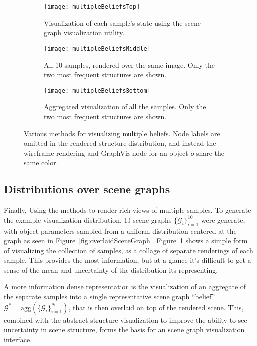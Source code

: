\raggedbottom
\pagebreak
\flushbottom

\begin{figure}[H]
  \begin{subfigure}[b]{\textwidth}
    \centering
    \texttt{[image: multipleBeliefsTop]}
    \caption{
      Visualization of each sample's state using the scene graph visualization utility.
    }
    \label{fig:multipleBeliefsTop}
  \end{subfigure}
  \begin{subfigure}[b]{\textwidth}
    \centering
    \texttt{[image: multipleBeliefsMiddle]}
    \caption{
      All 10 samples, rendered over the same image. Only the two most frequent structures are shown.
    }
    \label{fig:multipleBeliefsMiddle}
  \end{subfigure}
  \begin{subfigure}[b]{\textwidth}
    \centering
    \texttt{[image: multipleBeliefsBottom]}
    \caption{
      Aggregated visualization of all the samples. Only the two most frequent structures are shown.
    }
    \label{fig:multipleBeliefsBottom}
  \end{subfigure}
  \caption{
    Various methods for visualizing multiple beliefs.
    Node labels are omitted in the rendered structure distribution, and instead the wireframe rendering and GraphViz node for an object $o$ share the same color.
  }
  \label{fig:multipleBeliefs}
\end{figure}

\subsection{Distributions over scene graphs}
Finally, 
Using the methods to render rich views of multiple samples.
To generate the example visualization distribution, 10 scene graphs $\{\mathcal{G}_i\}_{i=1}^{10}$ were generate, with object parameters sampled from a uniform distribution centered at the graph as seen in Figure~\ref{fig:overlaidSceneGraph}.
Figure~\ref{fig:multipleBeliefsTop} shows a simple form of visualizing the collection of samples, as a collage of separate renderings of each sample.
This provides the most information, but at a glance it's difficult to get a sense of the mean and uncertainty of the distribution its representing.

A more information dense representation is the visualization of an aggregate of the separate samples into a single representative scene graph ``belief'' $\mathcal{G}^* = \mathrm{agg}(\{\mathcal{G}_i\}_{i=1}^N)$, that is then overlaid on top of the rendered scene.
This, combined with the abstract structure visualization to improve the ability to see uncertainty in scene structure, forms the basis for an scene graph visualization interface.

